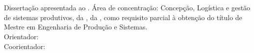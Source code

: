 \begin{center}
    {\singlespacing
    \MakeUppercase{\textbf{\aluno}} \\ [5cm]

    \MakeUppercase{\titulo} \\ [1cm]
    
    \hspace{.45\textwidth} %
        \begin{minipage}{.5\textwidth}
        \noindent Dissertação apresentada ao \curso. Área de concentração: Concepção, Logística e gestão de sistemas produtivos, da \departamento, da \universidade, como requisito parcial à obtenção do título de Mestre em Engenharia de Produção e Sistemas. \\ [5mm]
        \noindent Orientador: \orientador \\
        \noindent Coorientador: \coorientador
        \end{minipage}
    
    \vfill
    
    \MakeUppercase{\cidade} \\ 
    \ano}
\end{center}